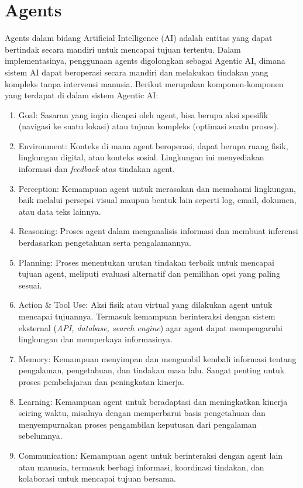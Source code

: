 \section{Agents}
\label{sec:agents}

Agents dalam bidang Artificial Intelligence (AI) adalah entitas yang dapat bertindak secara mandiri untuk mencapai tujuan tertentu. Dalam implementasinya, penggunaan agents digolongkan sebagai Agentic AI, dimana sistem AI dapat beroperasi secara mandiri dan melakukan tindakan yang kompleks tanpa intervensi manusia. Berikut merupakan komponen-komponen yang terdapat di dalam sistem Agentic AI:

\begin{enumerate}
	\item Goal: Sasaran yang ingin dicapai oleh agent, bisa berupa aksi spesifik (navigasi ke suatu lokasi) atau tujuan kompleks (optimasi suatu proses).
	\item Environment: Konteks di mana agent beroperasi, dapat berupa ruang fisik, lingkungan digital, atau konteks sosial. Lingkungan ini menyediakan informasi dan \textit{feedback} atas tindakan agent.
	\item Perception: Kemampuan agent untuk merasakan dan memahami lingkungan, baik melalui persepsi visual maupun bentuk lain seperti log, email, dokumen, atau data teks lainnya.
	\item Reasoning: Proses agent dalam menganalisis informasi dan membuat inferensi berdasarkan pengetahuan serta pengalamannya.
	\item Planning: Proses menentukan urutan tindakan terbaik untuk mencapai tujuan agent, meliputi evaluasi alternatif dan pemilihan opsi yang paling sesuai.
	\item Action \& Tool Use: Aksi fisik atau virtual yang dilakukan agent untuk mencapai tujuannya. Termasuk kemampuan berinteraksi dengan sistem eksternal (\textit{API, database, search engine}) agar agent dapat mempengaruhi lingkungan dan memperkaya informasinya.
	\item Memory: Kemampuan menyimpan dan mengambil kembali informasi tentang pengalaman, pengetahuan, dan tindakan masa lalu. Sangat penting untuk proses pembelajaran dan peningkatan kinerja.
	\item Learning: Kemampuan agent untuk beradaptasi dan meningkatkan kinerja seiring waktu, misalnya dengan memperbarui basis pengetahuan dan menyempurnakan proses pengambilan keputusan dari pengalaman sebelumnya.
	\item Communication: Kemampuan agent untuk berinteraksi dengan agent lain atau manusia, termasuk berbagi informasi, koordinasi tindakan, dan kolaborasi untuk mencapai tujuan bersama.
\end{enumerate}